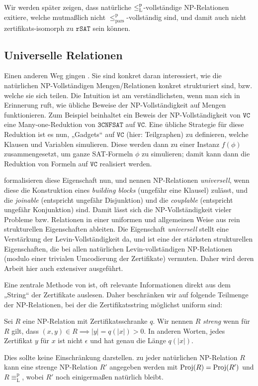Wir werden später zeigen, dass natürliche $\leq_\mathrm{L}^\mathrm{p}$-vollständige NP-Relationen exitiere, welche  mutmaßlich nicht $\leq_\mathrm{pars}^\mathrm p$-vollständig sind, und damit auch nicht zertifikats-isomorph zu $\mathtt{rSAT}$ sein können.

\subsection*{Universelle Relationen}

Einen anderen Weg gingen \textcite{agrawal_universal_1992}. Sie sind konkret daran interessiert, wie die natürlichen NP-Vollständigen Mengen/Relationen konkret strukturiert sind, bzw. welche sie sich teilen. 
Die Intuition ist am verständlichsten, wenn man sich in Erinnerung ruft, wie übliche Beweise der NP-Vollständigkeit auf Mengen funktionieren.
Zum Beispiel beinhaltet ein Beweis der NP-Vollständigkeit von $\mathtt{VC}$ eine Many-one-Reduktion von $\mathtt{3CNFSAT}$ auf $\mathtt{VC}$. 
Eine übliche Strategie für diese Reduktion ist es nun, „Gadgets“ auf $\mathtt{VC}$ (hier: Teilgraphen) zu definieren, welche Klausen und Variablen simulieren. Diese werden dann zu einer Instanz $f(\phi)$ zusammengesetzt, um ganze SAT-Formeln $\phi$ zu simulieren; damit kann dann die Reduktion von Formeln auf $\mathtt{VC}$ realisiert werden.

\citeauthor{agrawal_universal_1992} formalisieren diese Eigenschaft nun, und nennen NP-Relationen \emph{universell}, wenn diese die Konstruktion eines \emph{building blocks} (ungefähr eine Klausel) zulässt, und die \emph{joinable} (entspricht ungefähr Disjunktion) und die \emph{couplable} (entspricht ungefähr Konjunktion) sind. Damit lässt sich die NP-Vollständigkeit vieler Probleme bzw. Relationen in einer uniformen und allgemeinen Weise aus rein strukturellen Eigenschaften ableiten. 
Die Eigenschaft \emph{universell} stellt eine Verstärkung der Levin-Vollständigkeit da, und ist eine der stärksten strukturellen Eigenschaften, die \citeauthor{agrawal_universal_1992} bei allen natürlichen Levin-vollständigen NP-Relationen (modulo einer trivialen Umcodierung der Zertifikate) vermuten. Daher wird deren Arbeit hier auch extensiver ausgeführt.

Eine zentrale Methode von \citeauthor{agrawal_universal_1992} ist, oft relevante Informationen direkt aus dem „String“ der Zertifikate auslesen. Daher beschränken wir auf folgende Teilmenge der NP-Relationen, bei der die Zertifikatsstring möglichst uniform sind: 
\begin{definition}
    Sei $R$ eine NP-Relation mit Zertifikatsschranke $q$. 
    Wir nennen $R$ \emph{streng} wenn für $R$ gilt, dass $(x,y)\in R\implies |y|=q(|x|)>0$. In anderen Worten, jedes Zertifikat $y$ für $x$ ist nicht $\epsilon$ und hat genau die Länge $q(|x|)$.
\end{definition}
Dies sollte keine Einschränkung darstellen. zu jeder natürlichen NP-Relation $R$ kann eine strenge NP-Relation $R'$ angegeben werden mit $\operatorname{Proj}(R)=\operatorname{Proj}(R')$ und $R\equiv_\mathrm L^\mathrm p$, wobei $R'$ noch einigermaßen natürlich bleibt.%

